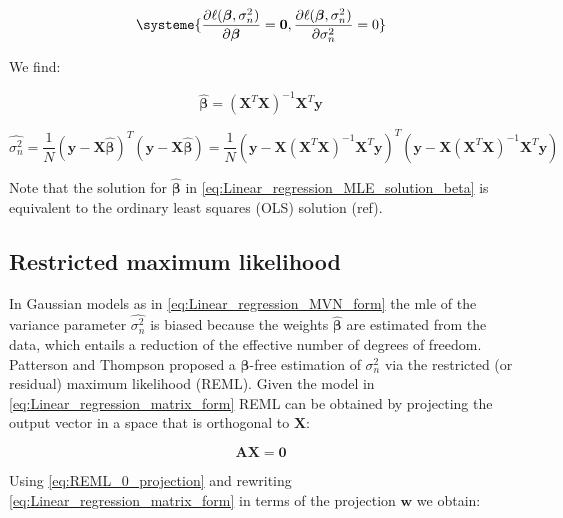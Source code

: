\begin{equation} \label{eq:Linear_regression_MLE_system}
\systeme{
    \dfrac{\partial \ell(\boldsymbol{\beta}, \sigma_n^2)}{\partial \boldsymbol{\beta}} = \mathbf{0},
    \dfrac{\partial \ell(\boldsymbol{\beta}, \sigma_n^2)}{\partial \sigma_n^2} = 0
    }
\end{equation}

We find:

\begin{equation} \label{eq:Linear_regression_MLE_solution_beta}
\hat{\boldsymbol{\beta}} = (\mathbf{X}^T\mathbf{X})^{-1}\mathbf{X}^T\mathbf{y} 
\end{equation}

\begin{equation} \label{eq:Linear_regression_MLE_solution_sigma}
 \hat{\sigma_n^2} = \frac{1}{N}(\mathbf{y}-\mathbf{X}\hat{\boldsymbol{\beta}})^T(\mathbf{y}-\mathbf{X}\hat{\boldsymbol{\beta}}) = \frac{1}{N}(\mathbf{y}-\mathbf{X}(\mathbf{X}^T\mathbf{X})^{-1}\mathbf{X}^T\mathbf{y})^T(\mathbf{y}-\mathbf{X}(\mathbf{X}^T\mathbf{X})^{-1}\mathbf{X}^T\mathbf{y}) 
\end{equation}

Note that the solution for $\hat{\boldsymbol{\beta}}$ in \eqref{eq:Linear_regression_MLE_solution_beta} is equivalent to the ordinary least squares (OLS) solution (ref).


\subsection{Restricted maximum likelihood}

In Gaussian models as in \eqref{eq:Linear_regression_MVN_form} the \gls{mle} of the variance parameter $\hat{\sigma_n^2}$ is biased because the weights $\hat{\boldsymbol{\beta}}$ are estimated from the data, which entails a reduction of the effective number of degrees of freedom.
Patterson and Thompson \cite{patterson1971recovery} proposed a $\boldsymbol{\beta}$-free estimation of $\sigma_n^2$ via the restricted (or residual) maximum likelihood (REML).
Given the model in \eqref{eq:Linear_regression_matrix_form} REML can be obtained by projecting the output vector in a space that is orthogonal to $\mathbf{X}$:

\begin{equation}\label{eq:REML_0_projection}
    \mathbf{A}\mathbf{X} = \mathbf{0}
\end{equation}

Using \eqref{eq:REML_0_projection} and rewriting \eqref{eq:Linear_regression_matrix_form} in terms of the projection $\mathbf{w}$ we obtain:

